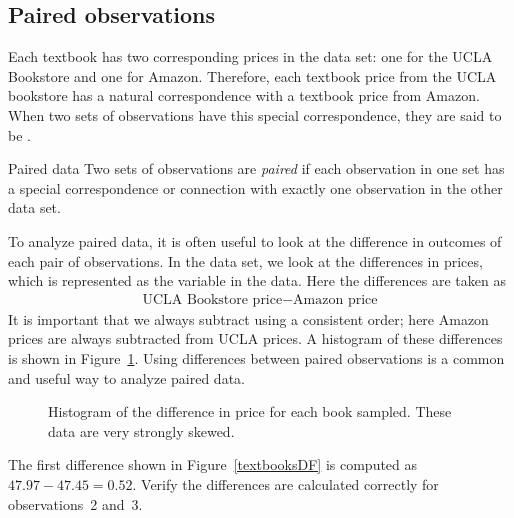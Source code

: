 \subsection{Paired observations}

Each textbook has two corresponding prices in the data set:
one for the UCLA Bookstore and one for Amazon.
Therefore, each textbook price from the UCLA bookstore
has a natural correspondence with a textbook price from
Amazon.
When two sets of observations have this special
correspondence, they are said to be .

\begin{onebox}{Paired data}
  Two sets of observations are \emph{paired} if each
  observation in one set has a special correspondence
  or connection with exactly one observation in the other
  data set.
\end{onebox}

To analyze paired data, it is often useful to look
at the difference in outcomes of each pair of observations.
In the  data set, we look at the differences
in prices, which is represented as the  variable
in the  data.
Here the differences are taken as
\begin{align*}
\text{UCLA Bookstore price} - \text{Amazon price}
\end{align*}
It is important that we always subtract using
a consistent order;
here Amazon prices are always subtracted from UCLA prices.
A histogram of these differences is shown in
Figure~\ref{diffInTextbookPricesF18}.
Using differences between paired observations
is a common and useful way to analyze paired data.

\begin{figure}[h]
  \centering
  \caption{Histogram of the difference in price for
      each book sampled.
      These data are very strongly skewed.
      }
  \label{diffInTextbookPricesF18}
\end{figure}

\begin{exercisewrap}
\begin{nexercise}
The first difference shown in Figure~\ref{textbooksDF}
is computed as $47.97 - 47.45 = 0.52$.
Verify the differences are calculated correctly for
observations~2 and~3.\footnotemark{}
\end{nexercise}
\end{exercisewrap}


